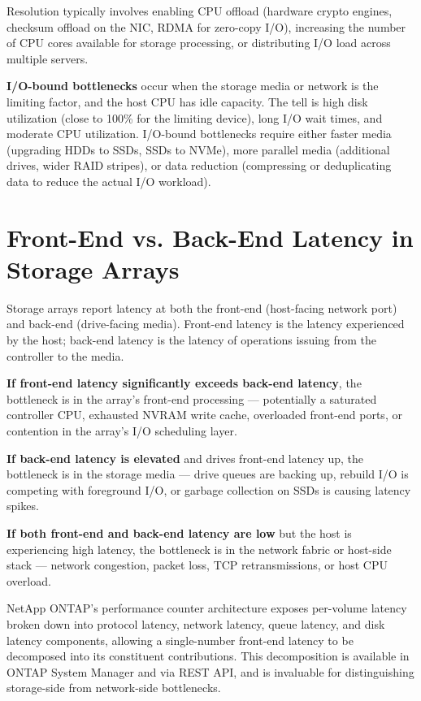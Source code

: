 Resolution typically involves enabling CPU offload (hardware crypto engines, checksum offload on the NIC, RDMA for zero-copy I/O), increasing the number of CPU cores available for storage processing, or distributing I/O load across multiple servers.

\textbf{I/O-bound bottlenecks} occur when the storage media or network is the limiting factor, and the host CPU has idle capacity. The tell is high disk utilization (close to 100\% for the limiting device), long I/O wait times, and moderate CPU utilization. I/O-bound bottlenecks require either faster media (upgrading HDDs to SSDs, SSDs to NVMe), more parallel media (additional drives, wider RAID stripes), or data reduction (compressing or deduplicating data to reduce the actual I/O workload).

\section{Front-End vs. Back-End Latency in Storage Arrays}
Storage arrays report latency at both the front-end (host-facing network port) and back-end (drive-facing media). Front-end latency is the latency experienced by the host; back-end latency is the latency of operations issuing from the controller to the media.

\textbf{If front-end latency significantly exceeds back-end latency}, the bottleneck is in the array's front-end processing --- potentially a saturated controller CPU, exhausted NVRAM write cache, overloaded front-end ports, or contention in the array's I/O scheduling layer.

\textbf{If back-end latency is elevated} and drives front-end latency up, the bottleneck is in the storage media --- drive queues are backing up, rebuild I/O is competing with foreground I/O, or garbage collection on SSDs is causing latency spikes.

\textbf{If both front-end and back-end latency are low} but the host is experiencing high latency, the bottleneck is in the network fabric or host-side stack --- network congestion, packet loss, TCP retransmissions, or host CPU overload.

NetApp ONTAP's performance counter architecture exposes per-volume latency broken down into protocol latency, network latency, queue latency, and disk latency components, allowing a single-number front-end latency to be decomposed into its constituent contributions. This decomposition is available in ONTAP System Manager and via REST API, and is invaluable for distinguishing storage-side from network-side bottlenecks.

